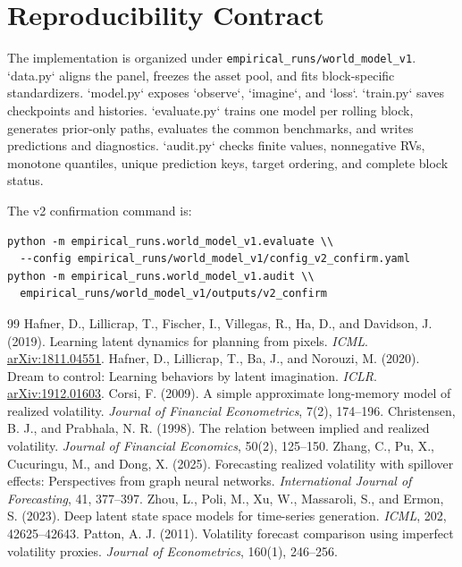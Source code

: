 \documentclass[11pt]{article}
\begin{document}
\appendix
\section{Reproducibility Contract}
The implementation is organized under \texttt{empirical\_runs/world\_model\_v1}. `data.py` aligns the panel, freezes the asset pool, and fits block-specific standardizers. `model.py` exposes `observe`, `imagine`, and `loss`. `train.py` saves checkpoints and histories. `evaluate.py` trains one model per rolling block, generates prior-only paths, evaluates the common benchmarks, and writes predictions and diagnostics. `audit.py` checks finite values, nonnegative RVs, monotone quantiles, unique prediction keys, target ordering, and complete block status.

The v2 confirmation command is:
\begin{verbatim}
python -m empirical_runs.world_model_v1.evaluate \\
  --config empirical_runs/world_model_v1/config_v2_confirm.yaml
python -m empirical_runs.world_model_v1.audit \\
  empirical_runs/world_model_v1/outputs/v2_confirm
\end{verbatim}

\begin{thebibliography}{99}
 Hafner, D., Lillicrap, T., Fischer, I., Villegas, R., Ha, D., and Davidson, J. (2019). Learning latent dynamics for planning from pixels. \emph{ICML}. \href{https://arxiv.org/abs/1811.04551}{arXiv:1811.04551}.
 Hafner, D., Lillicrap, T., Ba, J., and Norouzi, M. (2020). Dream to control: Learning behaviors by latent imagination. \emph{ICLR}. \href{https://arxiv.org/abs/1912.01603}{arXiv:1912.01603}.
 Corsi, F. (2009). A simple approximate long-memory model of realized volatility. \emph{Journal of Financial Econometrics}, 7(2), 174--196.
 Christensen, B. J., and Prabhala, N. R. (1998). The relation between implied and realized volatility. \emph{Journal of Financial Economics}, 50(2), 125--150.
 Zhang, C., Pu, X., Cucuringu, M., and Dong, X. (2025). Forecasting realized volatility with spillover effects: Perspectives from graph neural networks. \emph{International Journal of Forecasting}, 41, 377--397.
 Zhou, L., Poli, M., Xu, W., Massaroli, S., and Ermon, S. (2023). Deep latent state space models for time-series generation. \emph{ICML}, 202, 42625--42643.
 Patton, A. J. (2011). Volatility forecast comparison using imperfect volatility proxies. \emph{Journal of Econometrics}, 160(1), 246--256.
\end{thebibliography}
\end{document}
